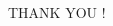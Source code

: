 \documentclass[CJK]{beamer}
\begin{document}
\begin{CJK*}{UTF8}{gbsn}
\begin{frame}
	\begin{center}
	{\LARGE THANK YOU !}
	\end{center}
\end{frame}

\end{CJK*}
\end{document}
